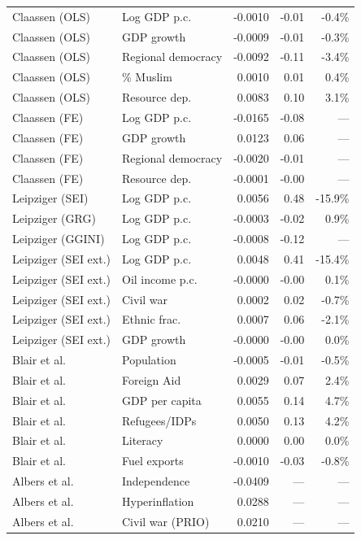 \documentclass[
]{article}
\begin{document}
\begin{longtable}[t]{llrrr}
\endfoot
\bottomrule
\endlastfoot
Claassen (OLS) & Log GDP p.c. & -0.0010 & -0.01 & -0.4\%\\
Claassen (OLS) & GDP growth & -0.0009 & -0.01 & -0.3\%\\
Claassen (OLS) & Regional democracy & -0.0092 & -0.11 & -3.4\%\\
Claassen (OLS) & \% Muslim & 0.0010 & 0.01 & 0.4\%\\
Claassen (OLS) & Resource dep. & 0.0083 & 0.10 & 3.1\%\\
\addlinespace
Claassen (FE) & Log GDP p.c. & -0.0165 & -0.08 & ---\\
Claassen (FE) & GDP growth & 0.0123 & 0.06 & ---\\
Claassen (FE) & Regional democracy & -0.0020 & -0.01 & ---\\
Claassen (FE) & Resource dep. & -0.0001 & -0.00 & ---\\
Leipziger (SEI) & Log GDP p.c. & 0.0056 & 0.48 & -15.9\%\\
\addlinespace
Leipziger (GRG) & Log GDP p.c. & -0.0003 & -0.02 & 0.9\%\\
Leipziger (GGINI) & Log GDP p.c. & -0.0008 & -0.12 & ---\\
Leipziger (SEI ext.) & Log GDP p.c. & 0.0048 & 0.41 & -15.4\%\\
Leipziger (SEI ext.) & Oil income p.c. & -0.0000 & -0.00 & 0.1\%\\
Leipziger (SEI ext.) & Civil war & 0.0002 & 0.02 & -0.7\%\\
\addlinespace
Leipziger (SEI ext.) & Ethnic frac. & 0.0007 & 0.06 & -2.1\%\\
Leipziger (SEI ext.) & GDP growth & -0.0000 & -0.00 & 0.0\%\\
Blair et al. & Population & -0.0005 & -0.01 & -0.5\%\\
Blair et al. & Foreign Aid & 0.0029 & 0.07 & 2.4\%\\
Blair et al. & GDP per capita & 0.0055 & 0.14 & 4.7\%\\
\addlinespace
Blair et al. & Refugees/IDPs & 0.0050 & 0.13 & 4.2\%\\
Blair et al. & Literacy & 0.0000 & 0.00 & 0.0\%\\
Blair et al. & Fuel exports & -0.0010 & -0.03 & -0.8\%\\
Albers et al. & Independence & -0.0409 & --- & ---\\
Albers et al. & Hyperinflation & 0.0288 & --- & ---\\
\addlinespace
Albers et al. & Civil war (PRIO) & 0.0210 & --- & ---\\

\end{longtable}
\end{document}
